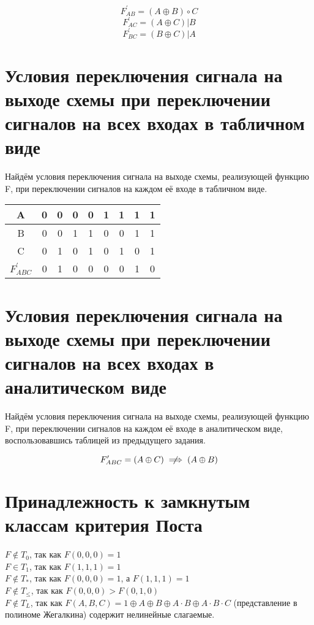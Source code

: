 \documentclass[a4paper,10pt]{article} %
\begin{document}
	\begin{equation*}
		F_{AB}^{\prime} = (A \oplus B) \circ C
	\end{equation*}
	\begin{equation*}
		F_{AC}^{\prime} = (A \oplus C) | B
	\end{equation*}
	\begin{equation*}
		F_{BC}^{\prime} = (B \oplus C) | A
	\end{equation*}
	
	\section{Условия переключения сигнала на выходе схемы при переключении сигналов на всех входах в табличном виде}
	Найдём условия переключения сигнала на выходе схемы, реализующей функцию F, при переключении сигналов на каждом её входе в табличном виде.
	
	\begin{tabular}{|c|c|c|c|c|c|c|c|c|}
		\hline 
		A & 0 & 0 & 0 & 0 & 1 & 1 & 1 & 1 \\ 
		\hline 
		B & 0 & 0 & 1 & 1 & 0 & 0 & 1 & 1 \\ 
		\hline 
		C & 0 & 1 & 0 & 1 & 0 & 1 & 0 & 1 \\ 
		\hline 
		$F_{ABC}^{\prime}$ & 0 & 1 & 0 & 0 & 0 & 0 & 1 & 0 \\ 
		\hline 
		\end{tabular} 
	
	\section{Условия переключения сигнала на выходе схемы при переключении сигналов на всех входах в аналитическом виде}
	Найдём условия переключения сигнала на выходе схемы, реализующей функцию F, при переключении сигналов на каждом её входе в аналитическом виде, воспользовавшись таблицей из предыдущего задания.
	
	\begin{equation*}
		F_{ABC}^{\prime} = (A \oplus C) \centernot\implies (A \oplus B)
	\end{equation*}
	
	\section{Принадлежность к замкнутым классам критерия Поста}
	$F \notin T_{0}$, так как $F(0, 0, 0) = 1$ \\
	$F \in T_{1}$, так как $F(1, 1, 1) = 1$ \\
	$F \notin T_{*}$, так как $F(0, 0, 0) = 1$, а  $F(1, 1, 1) = 1$ \\
	$F \notin T_{\leq}$, так как $F(0, 0, 0) > F(0, 1, 0)$ \\
	$F \notin T_{L}$, так как $F(A, B, C) = 1 \oplus A \oplus B \oplus A \cdot B 
	\oplus A \cdot B\cdot C$ (представление в полиноме Жегалкина) содержит нелинейные слагаемые.
	
	
\end{document}
